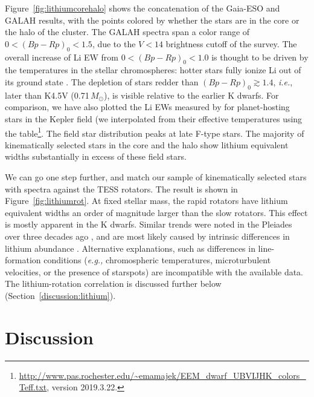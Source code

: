 \documentclass[12pt,twocolumn,tighten]{aastex63}
\begin{document}
Figure~\ref{fig:lithiumcorehalo} shows the concatenation of the
Gaia-ESO and GALAH results, with the points colored by whether the
stars are in the core or the halo of the cluster.  The GALAH spectra
span a color range of $0<(Bp-Rp)_0<1.5$, due to the $V<14$ brightness
cutoff of the survey.  The overall increase of Li EW from
$0<(Bp-Rp)_0<1.0$ is thought to be driven by the temperatures in the
stellar chromospheres: hotter stars fully ionize Li out of its ground
state \citep[{\it e.g.},Figure~4 of][]{soderblom_evolution_1993}.  The
depletion of stars redder than $(Bp-Rp)_0\gtrsim1.4$, {\it i.e.},
later than K4.5V (0.71\,$M_\odot$), is visible relative to the earlier
K dwarfs.  For comparison, we have also plotted the Li EWs measured by
\citet{berger_identifying_2018} for planet-hosting stars in the Kepler
field (we interpolated from their effective temperatures using the
\citet{pecaut_mamajek_2013}
table\footnote{\url{http://www.pas.rochester.edu/~emamajek/EEM_dwarf_UBVIJHK_colors_Teff.txt},
version 2019.3.22.}.  The field star distribution peaks at late F-type
stars.  The majority of kinematically selected stars in the core and
the halo show lithium equivalent widths substantially in excess of
these field stars.

We can go one step further, and match our sample of kinematically
selected stars with spectra against the TESS rotators.  The result is
shown in Figure~\ref{fig:lithiumrot}. At fixed stellar mass, the rapid
rotators have lithium equivalent widths an order of magnitude larger
than the slow rotators.  This effect is mostly apparent in the K
dwarfs.  Similar trends were noted in the Pleiades over three decades
ago \citep{butler_pleiades_1987}, and are most likely caused by
intrinsic differences in lithium abundance
\citep{soderblom_evolution_1993}.  Alternative explanations, such as
differences in line-formation conditions ({\it e.g.,} chromospheric
temperatures, microturbulent velocities, or the presence of starspots)
are incompatible with the available data.  The lithium-rotation
correlation is discussed further below
(Section~\ref{discussion:lithium}).




\section{Discussion}
\label{sec:discussion}
\end{document}
